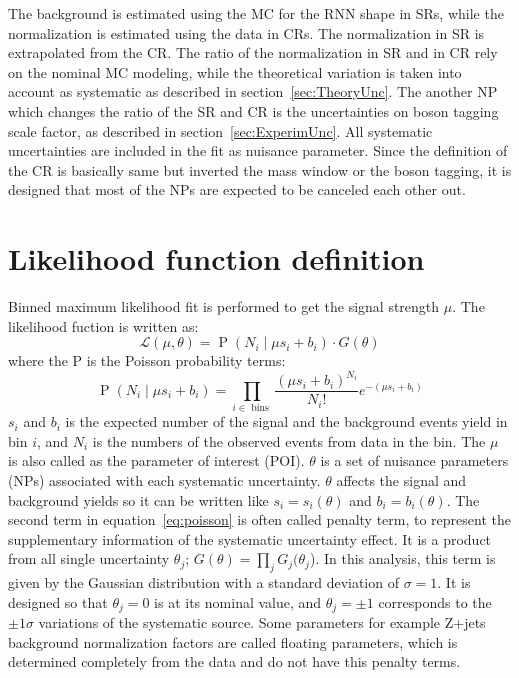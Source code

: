 The background is estimated using the MC for the RNN shape in SRs, while the normalization is estimated using the data in CRs.
The normalization in SR is extrapolated from the CR. 
The ratio of the normalization in SR and in CR rely on the nominal MC modeling, while the theoretical variation is taken into account as systematic as described in section~\ref{sec:TheoryUnc}.
The another NP which changes the ratio of the SR and CR is the uncertainties on boson tagging scale factor, as described in section~\ref{sec:ExperimUnc}.
All systematic uncertainties are included in the fit as nuisance parameter. Since the definition of the CR is basically same but inverted the mass window or the boson tagging, it is designed that most of the NPs are expected to be canceled each other out.

\section{Likelihood function definition}
\label{sec:likelihood}
Binned maximum likelihood fit is performed to get the signal strength $\mu$. The likelihood fuction is written as:
\begin{equation}
\label{eq:poisson}
\mathcal{L}(\mu, \theta) = \operatorname{P}\left(N_{i} \mid \mu s_{i}+b_{i}\right) \cdot G(\theta) 
\end{equation}
where the P is the Poisson probability terms:
\begin{equation}
\operatorname{P}\left(N_{i} \mid \mu s_{i}+b_{i}\right) = \prod_{i \in \text { bins }} \frac{\left(\mu s_{i}+b_{i}\right)^{N_{i}}}{N_{i} !} e^{-\left(\mu s_{i}+b_{i}\right)} 
\end{equation}
$s_i$ and $b_i$ is the expected number of the signal and the background events yield in bin $i$, and $N_i$ is the numbers of the observed events from data in the bin. 
The $\mu$ is also called as the parameter of interest (POI). $\theta$ is a set of nuisance parameters (NPs) associated with each systematic uncertainty. $\theta$ affects the signal and background yields so it can be written like $s_{i}=s_{i}(\theta)$ and $b_{i}=b_{i}(\theta)$. 
The second term in equation~\ref{eq:poisson} is often called penalty term, to represent the supplementary information of the systematic uncertainty effect. It is a product from all single uncertainty $\theta_j$; $G(\theta) = \prod_{j}G_{j}(\theta_{j}$). 
In this analysis, this term is given by the Gaussian distribution with a standard deviation of $\sigma = 1$. It is designed so that $\theta_j = 0$ is at its nominal value, and $\theta_j = \pm 1$ corresponds to the $\pm 1 \sigma$ variations of the systematic source. 
Some parameters for example Z+jets background normalization factors are called floating parameters, which is determined completely from the data and do not have this penalty terms.

